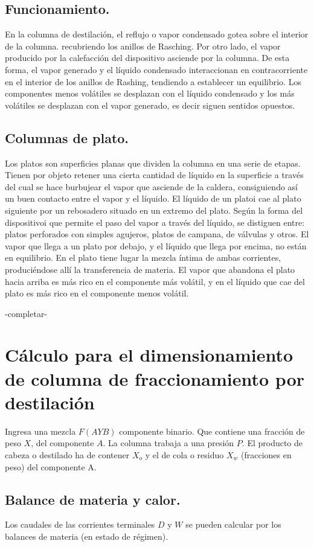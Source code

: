 \documentclass[11pt,openany]{book}
\begin{document}
\subsection{Funcionamiento.}
En la columna de destilación, el reflujo o vapor condensado gotea sobre el interior de la columna.
recubriendo los anillos de Rasching.
Por otro lado, el vapor producido por la calefacción del dispositivo asciende por la columna.
De esta forma, el vapor generado y el líquido condensado interaccionan en contracorriente en el 
interior de los anillos de Rashing, tendiendo a establecer un equilibrio. Los componentes menos 
volátiles se desplazan con el líquido condensado y los más volátiles se desplazan con el vapor generado, 
es decir siguen sentidos opuestos.
\subsection{Columnas de plato.}
Los platos son superficies planas que dividen la columna en una serie de etapas.
Tienen por objeto retener una cierta cantidad de líquido en la superficie a través del cual se hace 
burbujear el vapor que asciende de la caldera, consiguiendo así un buen contacto entre el vapor y el líquido.
El líquido de un platoi cae al plato siguiente por un rebosadero situado en un extremo del plato.
Según la forma del dispositivoi que permite el paso del vapor a través del líquido, se distiguen entre:
platos perforados con simples agujeros, platos de campana, de válvulas y otros.
El vapor que llega a un plato por debajo, y el líquido que llega por encima, no están en equilibrio. 
En el plato tiene lugar la mezcla íntima de ambas corrientes, produciéndose allí la transferencia de materia.
El vapor que abandona el plato hacia arriba es más rico en el componente más volátil, y en el líquido que 
cae del plato es más rico en el componente menos volátil. 

-completar-

\section{Cálculo para el dimensionamiento de columna de fraccionamiento por destilación}

Ingresa una mezcla $F(A Y B)$ componente binario. Que contiene una fracción de peso $X$,
del componente $A$.
La columna trabaja a una presión $P$.
El producto de cabeza o destilado ha de contener $X_o$ y el de cola o residuo $X_w$
(fracciones en peso) del componente A.

\subsection{Balance de materia y calor.}
Los caudales de las corrientes terminales $D$ y $W$ se pueden calcular por los balances de materia 
(en estado de régimen).
\end{document}
